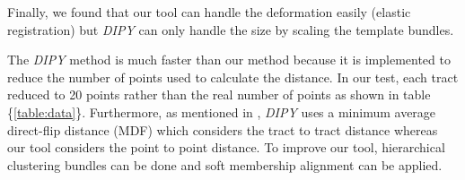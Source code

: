 \documentclass[../structure.tex]{subfiles}
\begin{document}
Finally, we found that our tool can handle the deformation easily (elastic registration) but \textit{DIPY} can only handle the size by scaling the template bundles.

The \textit{DIPY} method is much faster than our method because it is implemented to reduce the number of points used to calculate the distance. In our test, each tract reduced to 20 points rather than the real number of points as shown in table \{\ref{table:data}\}. Furthermore, as mentioned in \cite{Garyfallidis2012}, \textit{DIPY} uses a minimum average direct-flip distance (MDF) which considers the tract to tract distance whereas our tool considers the point to point distance. To improve our tool, hierarchical clustering bundles can be done and soft membership alignment can be applied.
\end{document}
